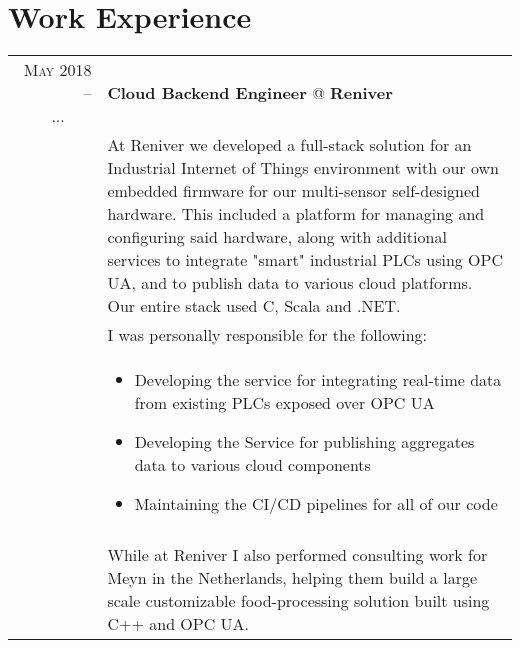 \documentclass[a4paper,10pt]{article}
\begin{document}
\section{\textcolor{awesome-red}{Wor}k Experience}
	\begin{tabular}{r|p{11cm}}
	
	\textsc{May 2018 – \textcolor{white}{......}...\textcolor{white}{......}} & \textbf{Cloud Backend Engineer} @ \textbf{Reniver} \\
	& \footnotesize{At Reniver we developed a full-stack solution for an Industrial Internet of Things environment with our own embedded firmware for our multi-sensor self-designed hardware.
	This included a platform for managing and configuring said hardware, along with additional services to integrate "smart" industrial PLCs using OPC UA, and to publish data to various cloud platforms.
	Our entire stack used C, Scala and .NET. }\\
	& \footnotesize{I was personally responsible for the following:}\\
	& \begin{minipage} [t] {0.9\textwidth} 
      	\begin{itemize}
      	\item\footnotesize{Developing the service for integrating real-time data from existing PLCs exposed over OPC UA}
      	\item\footnotesize{Developing the Service for publishing aggregates data to various cloud components}
      	\item\footnotesize{Maintaining the CI/CD pipelines for all of our code}
     	\end{itemize} 
	\end{minipage} \\ \\
	
    & \footnotesize{While at Reniver I also performed consulting work for Meyn in the Netherlands, helping them build a large scale customizable food-processing solution built using C++ and OPC UA.}
	
	\multicolumn{2}{c}{} \\
	

\end{tabular}
\end{document}
